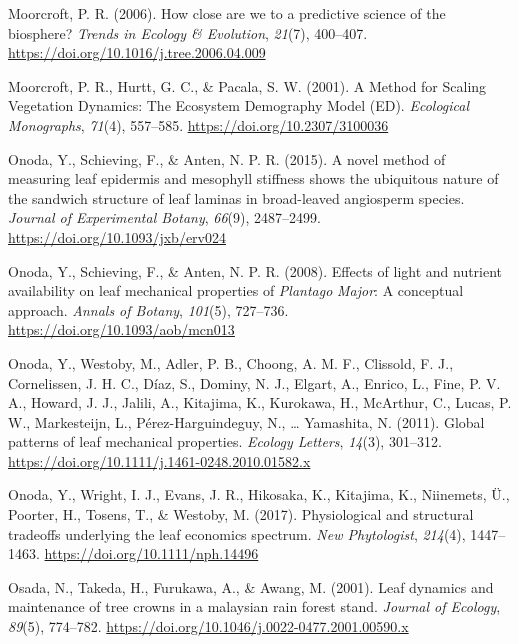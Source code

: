 \documentclass[
  12pt,
  a4paper,
,tablecaptionabove
]{scrartcl}
\newlength{\cslhangindent}
\newenvironment{CSLReferences}[2] %
 {%
  \setlength{\parindent}{0pt}
  \ifodd #1 \everypar{\setlength{\hangindent}{\cslhangindent}}\ignorespaces\fi
  \ifnum #2 > 0
  \setlength{\parskip}{#2\baselineskip}
  \fi
 }%
 {}
\begin{document}
\begin{CSLReferences}{1}{0}
\leavevmode{}%
Moorcroft, P. R. (2006). How close are we to a predictive science of the
biosphere? \emph{Trends in Ecology \& Evolution}, \emph{21}(7),
400--407. \url{https://doi.org/10.1016/j.tree.2006.04.009}

\leavevmode{}%
Moorcroft, P. R., Hurtt, G. C., \& Pacala, S. W. (2001). A {Method} for
{Scaling Vegetation Dynamics}: {The Ecosystem Demography Model} ({ED}).
\emph{Ecological Monographs}, \emph{71}(4), 557--585.
\url{https://doi.org/10.2307/3100036}

\leavevmode{}%
Onoda, Y., Schieving, F., \& Anten, N. P. R. (2015). A novel method of
measuring leaf epidermis and mesophyll stiffness shows the ubiquitous
nature of the sandwich structure of leaf laminas in broad-leaved
angiosperm species. \emph{Journal of Experimental Botany}, \emph{66}(9),
2487--2499. \url{https://doi.org/10.1093/jxb/erv024}

\leavevmode{}%
Onoda, Y., Schieving, F., \& Anten, N. P. R. (2008). Effects of light
and nutrient availability on leaf mechanical properties of
{\emph{Plantago}}{ \emph{Major}}: {A} conceptual approach. \emph{Annals
of Botany}, \emph{101}(5), 727--736.
\url{https://doi.org/10.1093/aob/mcn013}

\leavevmode{}%
Onoda, Y., Westoby, M., Adler, P. B., Choong, A. M. F., Clissold, F. J.,
Cornelissen, J. H. C., Díaz, S., Dominy, N. J., Elgart, A., Enrico, L.,
Fine, P. V. A., Howard, J. J., Jalili, A., Kitajima, K., Kurokawa, H.,
McArthur, C., Lucas, P. W., Markesteijn, L., Pérez-Harguindeguy, N.,
\ldots{} Yamashita, N. (2011). Global patterns of leaf mechanical
properties. \emph{Ecology Letters}, \emph{14}(3), 301--312.
\url{https://doi.org/10.1111/j.1461-0248.2010.01582.x}

\leavevmode{}%
Onoda, Y., Wright, I. J., Evans, J. R., Hikosaka, K., Kitajima, K.,
Niinemets, Ü., Poorter, H., Tosens, T., \& Westoby, M. (2017).
Physiological and structural tradeoffs underlying the leaf economics
spectrum. \emph{New Phytologist}, \emph{214}(4), 1447--1463.
\url{https://doi.org/10.1111/nph.14496}

\leavevmode{}%
Osada, N., Takeda, H., Furukawa, A., \& Awang, M. (2001). Leaf dynamics
and maintenance of tree crowns in a malaysian rain forest stand.
\emph{Journal of Ecology}, \emph{89}(5), 774--782.
\url{https://doi.org/10.1046/j.0022-0477.2001.00590.x}


\end{CSLReferences}
\end{document}
